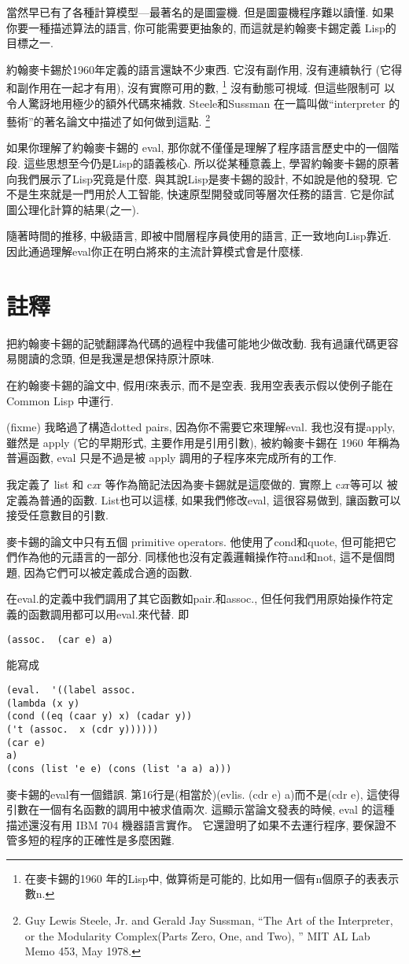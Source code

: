 \documentclass[12pt]{article}
\begin{document}
\begin{CJK}{UTF8}{bsmi}
當然早已有了各種計算模型---最著名的是圖靈機. 
但是圖靈機程序難以讀懂. 
如果你要一種描述算法的語言, 
你可能需要更抽象的, 
而這就是約翰麥卡錫定義 
Lisp的目標之一. 

約翰麥卡錫於1960年定義的語言還缺不少東西. 
它沒有副作用, 
沒有連續執行 
(它得和副作用在一起才有用), 
沒有實際可用的數, \footnote{在麥卡錫的1960 
年的Lisp中, 
做算術是可能的, 
比如用一個有n個原子的表表示數n.} 
沒有動態可視域. 
但這些限制可 
以令人驚訝地用極少的額外代碼來補救. 
Steele和Sussman
在一篇叫做``interpreter 的藝術''的著名論文中描述了如何做到這點.
\footnote{Guy Lewis Steele, Jr.  and Gerald Jay Sussman,
``The Art of the Interpreter, or the Modularity Complex(Parts Zero, One, and Two), '' 
MIT AL Lab Memo 453, May 1978.} 

如果你理解了約翰麥卡錫的 eval, 
那你就不僅僅是理解了程序語言歷史中的一個階段. 
這些思想至今仍是Lisp的語義核心. 
所以從某種意義上, 
學習約翰麥卡錫的原著向我們展示了Lisp究竟是什麼. 
與其說Lisp是麥卡錫的設計, 不如說是他的發現. 
它不是生來就是一門用於人工智能, 
快速原型開發或同等層次任務的語言. 
它是你試圖公理化計算的結果(之一). 

隨著時間的推移, 
中級語言, 
即被中間層程序員使用的語言, 
正一致地向Lisp靠近. 
因此通過理解eval你正在明白將來的主流計算模式會是什麼樣. 

\section{註釋} 
把約翰麥卡錫的記號翻譯為代碼的過程中我儘可能地少做改動. 
我有過讓代碼更容易閱讀的念頭, 
但是我還是想保持原汁原味. 

在約翰麥卡錫的論文中, 假用f來表示, 
而不是空表. 
我用空表表示假以使例子能在
Common Lisp 中運行. 

(fixme) 
我略過了構造dotted 
pairs, 
因為你不需要它來理解eval. 
我也沒有提apply, 
雖然是 apply (它的早期形式, 主要作用是引用引數), 被約翰麥卡錫在 1960 年稱為普遍函數, 
eval 只是不過是被 apply 調用的子程序來完成所有的工作. 

我定義了 list 和 c{\it x}r 等作為簡記法因為麥卡錫就是這麼做的. 
實際上 c{\it x}r等可以 被定義為普通的函數.  List也可以這樣, 如果我們修改eval, 
這很容易做到, 讓函數可以接受任意數目的引數.  

麥卡錫的論文中只有五個 primitive operators. 
他使用了cond和quote, 但可能把它們作為他的元語言的一部分. 
同樣他也沒有定義邏輯操作符and和not, 
這不是個問題, 
因為它們可以被定義成合適的函數. 

在eval.的定義中我們調用了其它函數如pair.和assoc.,
但任何我們用原始操作符定義的函數調用都可以用eval.來代替. 
即 
\begin{verbatim} 
(assoc.  (car e) a) 
\end{verbatim} 
能寫成 
\begin{verbatim} 
(eval.  '((label assoc. 
(lambda (x y) 
(cond ((eq (caar y) x) (cadar y)) 
('t (assoc.  x (cdr y)))))) 
(car e) 
a) 
(cons (list 'e e) (cons (list 'a a) a))) 
\end{verbatim} 
麥卡錫的eval有一個錯誤. 
第16行是(相當於)(evlis.  (cdr e) a)而不是(cdr e), 
這使得引數在一個有名函數的調用中被求值兩次. 
這顯示當論文發表的時候, 
eval 的這種描述還沒有用 IBM 704 機器語言實作。
它還證明了如果不去運行程序, 
要保證不管多短的程序的正確性是多麼困難. 


\end{CJK}
\end{document}
